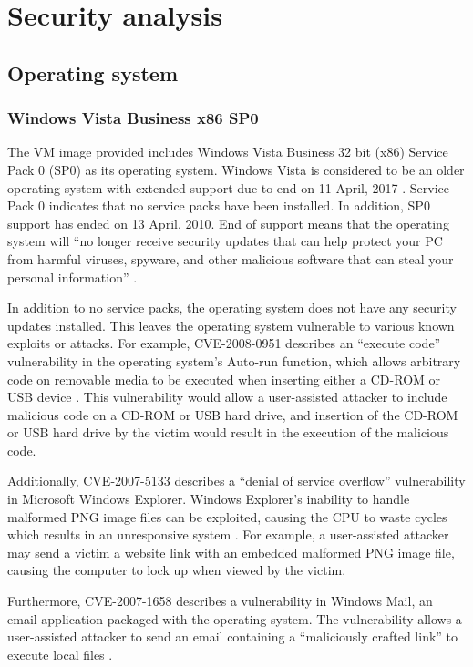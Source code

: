 \section{Security analysis}

\subsection{Operating system}

\subsubsection{Windows Vista Business x86 SP0}

The VM image provided includes Windows Vista Business 32 bit (x86) Service Pack 0 (SP0) as its operating system. Windows Vista is considered to be an older operating system with extended support due to end on 11 April, 2017 \citep{Microsoft2014}. Service Pack 0 indicates that no service packs have been installed. In addition, SP0 support has ended on 13 April, 2010. End of support means that the operating system will ``no longer receive security updates that can help protect your PC from harmful viruses, spyware, and other malicious software that can steal your personal information'' \citep{MicrosoftSupportLifecycle}.

In addition to no service packs, the operating system does not have any security updates installed. This leaves the operating system vulnerable to various known exploits or attacks. For example, CVE-2008-0951 describes an ``execute code'' vulnerability in the operating system's Auto-run function, which allows arbitrary code on removable media to be executed when inserting either a CD-ROM or USB device \citep{SecurityFocus2008}. This vulnerability would allow a user-assisted attacker to include malicious code on a CD-ROM or USB hard drive, and insertion of the CD-ROM or USB hard drive by the victim would result in the execution of the malicious code.

Additionally, CVE-2007-5133 describes a ``denial of service overflow'' vulnerability in Microsoft Windows Explorer. Windows Explorer's inability to handle malformed PNG image files can be exploited, causing the CPU to waste cycles which results in an unresponsive system \citep{SecurityFocus2007a}. For example, a user-assisted attacker may send a victim a website link with an embedded malformed PNG image file, causing the computer to lock up when viewed by the victim.

Furthermore, CVE-2007-1658 describes a vulnerability in Windows Mail, an email application packaged with the operating system. The vulnerability allows a user-assisted attacker to send an email containing a ``maliciously crafted link'' to execute local files \citep{SecurityFocus2007b}.

